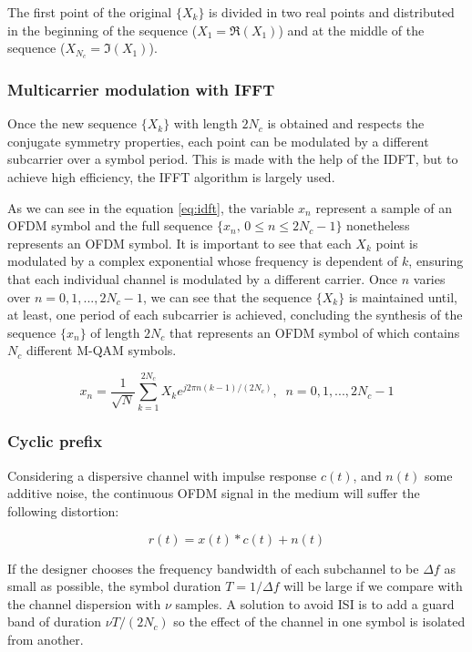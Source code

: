 The first point of the original $\{X_k\}$ is divided in two real points and distributed in the beginning of the sequence ($X_1= \Re(X_1)$) and at the middle of the sequence ($X_{N_c} = \Im(X_1)$).

\subsubsection{Multicarrier modulation with IFFT}

Once the new sequence $\{X_k\}$ with length $2N_c$ is obtained and respects the conjugate symmetry properties, each point can be modulated by a different subcarrier over a symbol period. This is made with the help of the IDFT, but to achieve high efficiency, the IFFT algorithm is largely used. 

As we can see in the equation \ref{eq:idft}, the variable $x_n$ represent a sample of an OFDM symbol and the full sequence $\{x_n, \, 0 \leq n \leq 2N_c-1\}$ nonetheless represents an OFDM symbol. It is important to see that each $X_k$ point is modulated by a complex exponential whose frequency is dependent of $k$, ensuring that each individual channel is modulated by a different carrier. Once $n$ varies over $n = 0,1,...,2N_c-1$, we can see that the sequence $\{X_k\}$ is maintained until, at least, one period of each subcarrier is achieved, concluding the synthesis of the sequence $\{x_n\}$ of length $2N_c$ that represents an OFDM symbol of which contains $N_c$ different M-QAM symbols.

\begin{equation} \label{eq:idft}
    x_n = \frac{1}{\sqrt{N}} \sum_{k=1}^{2N_c} X_k e^{j2\pi n(k-1)/(2N_c)}, \; \; n = 0,1,...,2N_c-1
\end{equation}

\subsubsection{Cyclic prefix}

Considering a dispersive channel with impulse response $c(t)$, and $n(t)$ some additive noise, the continuous OFDM signal in the medium will suffer the following distortion:

\begin{equation}
    r(t) = x(t) \ast c(t) + n(t)
\end{equation}

If the designer chooses the frequency bandwidth of each subchannel to be $\Delta f$ as small as possible, the symbol duration $T=1/\Delta f$ will be large if we compare with the channel dispersion with $\nu$ samples. A solution to avoid ISI is to add a guard band of duration $\nu T/(2N_c)$ so the effect of the channel in one symbol is isolated from another.

